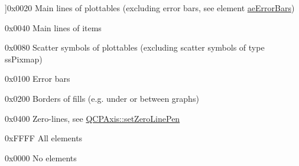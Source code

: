 \begin{Desc}
\begin{description}
{}]{\ttfamily 0x0020} Main lines of plottables (excluding error bars, see element \hyperlink{a00143_ae55dbe315d41fe80f29ba88100843a0ca9dcf3882cb321bb305f71fdc0f09f63d}{ae\+Error\+Bars}) \item[{\em 
\hypertarget{a00143_ae55dbe315d41fe80f29ba88100843a0caf7712a85d6b0c75b24301d2fe9484db3}{ae\+Items}\label{a00143_ae55dbe315d41fe80f29ba88100843a0caf7712a85d6b0c75b24301d2fe9484db3}
}]{\ttfamily 0x0040} Main lines of items \item[{\em 
\hypertarget{a00143_ae55dbe315d41fe80f29ba88100843a0cae45ed8cd167bffe27d7f40da4bc17e9c}{ae\+Scatters}\label{a00143_ae55dbe315d41fe80f29ba88100843a0cae45ed8cd167bffe27d7f40da4bc17e9c}
}]{\ttfamily 0x0080} Scatter symbols of plottables (excluding scatter symbols of type ss\+Pixmap) \item[{\em 
\hypertarget{a00143_ae55dbe315d41fe80f29ba88100843a0ca9dcf3882cb321bb305f71fdc0f09f63d}{ae\+Error\+Bars}\label{a00143_ae55dbe315d41fe80f29ba88100843a0ca9dcf3882cb321bb305f71fdc0f09f63d}
}]{\ttfamily 0x0100} Error bars \item[{\em 
\hypertarget{a00143_ae55dbe315d41fe80f29ba88100843a0ca788810f0aa930137de6ad6cc6d83d354}{ae\+Fills}\label{a00143_ae55dbe315d41fe80f29ba88100843a0ca788810f0aa930137de6ad6cc6d83d354}
}]{\ttfamily 0x0200} Borders of fills (e.\+g. under or between graphs) \item[{\em 
\hypertarget{a00143_ae55dbe315d41fe80f29ba88100843a0ca261f8ea78cf3c9561726223ffa33dc12}{ae\+Zero\+Line}\label{a00143_ae55dbe315d41fe80f29ba88100843a0ca261f8ea78cf3c9561726223ffa33dc12}
}]{\ttfamily 0x0400} Zero-\/lines, see \hyperlink{a00025_a533e5aa7fb4981ebc3db761d1e0e38d1}{Q\+C\+P\+Axis\+::set\+Zero\+Line\+Pen} \item[{\em 
\hypertarget{a00143_ae55dbe315d41fe80f29ba88100843a0caa897c232a0ffc8368e7c100ffc59ef31}{ae\+All}\label{a00143_ae55dbe315d41fe80f29ba88100843a0caa897c232a0ffc8368e7c100ffc59ef31}
}]{\ttfamily 0x\+F\+F\+F\+F} All elements \item[{\em 
\hypertarget{a00143_ae55dbe315d41fe80f29ba88100843a0caa9e90d81896358757d94275aeaa58f6a}{ae\+None}\label{a00143_ae55dbe315d41fe80f29ba88100843a0caa9e90d81896358757d94275aeaa58f6a}
}]{\ttfamily 0x0000} No elements \end{description}
\end{Desc}


